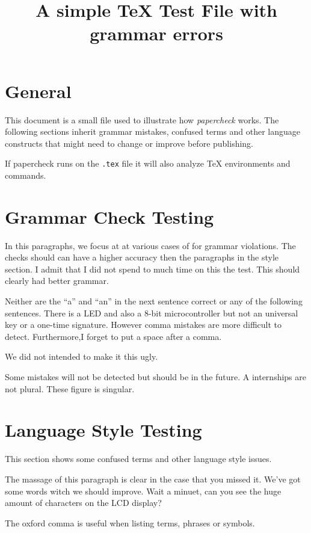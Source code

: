 \documentclass{scrartcl}
\title{A simple TeX Test File with grammar errors}
\begin{document}
\maketitle


\section{General}
This document is a small file used to illustrate how \emph{papercheck} works.
The following sections inherit grammar mistakes, confused terms and other language constructs that might need to change or improve before publishing.


If papercheck runs on the \verb!.tex! file it will also analyze TeX environments and commands.




\section{Grammar Check Testing}
In this paragraphs, we focus at at various cases of for grammar violations.
The checks should can have a higher accuracy then the paragraphs in the style section.
I admit that I did not spend to much time on this the test.
This should clearly had better grammar.

Neither are the “a” and “an” in the next sentence correct or any of the following sentences.
There is a LED and also a 8-bit microcontroller but not an universal key or a one-time signature.
However comma mistakes are more difficult to detect.
Furthermore,I forget to put a space after a comma.

We did not intended to make it this ugly.

Some mistakes will not be detected but should be in the future.
A internships are not plural. These figure is singular.






\section{Language Style Testing}
This section shows some confused terms and other language style issues.

The massage of this paragraph is clear in the case that you missed it. We've got some words witch we should improve.
Wait a minuet, can you see the huge amount of characters on the LCD display? 

The oxford comma is useful when listing terms, phrases or symbols.
\end{document}
